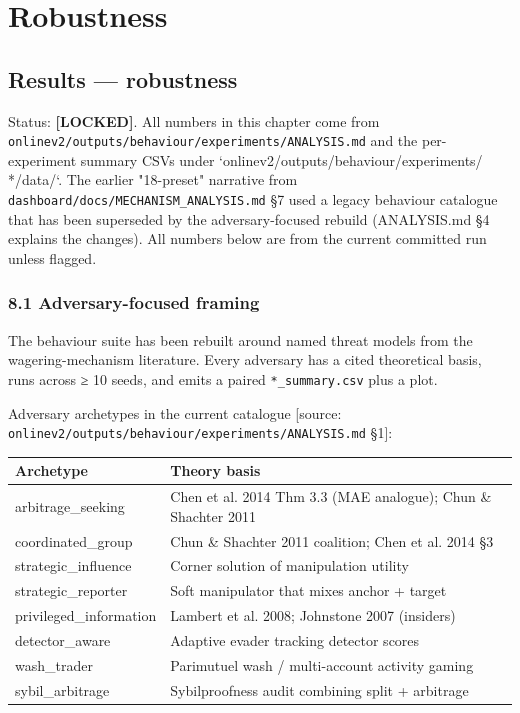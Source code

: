\documentclass[11pt,a4paper,openany]{report}
\begin{document}
\part*{Robustness}
\chapter{Results — robustness}

Status: \textbf{[LOCKED]}. All numbers in this chapter come from
\texttt{onlinev2/outputs/behaviour/experiments/ANALYSIS.md} and the per-
experiment summary CSVs under `onlinev2/outputs/behaviour/experiments/
*/data/`. The earlier "18-preset" narrative from
\texttt{dashboard/docs/MECHANISM\_ANALYSIS.md} §7 used a legacy behaviour
catalogue that has been superseded by the adversary-focused rebuild
(ANALYSIS.md §4 explains the changes). All numbers below are from the
current committed run unless flagged.

\section{8.1 Adversary-focused framing}

The behaviour suite has been rebuilt around named threat models from
the wagering-mechanism literature. Every adversary has a cited
theoretical basis, runs across ≥ 10 seeds, and emits a paired
\texttt{*\_summary.csv} plus a plot.

Adversary archetypes in the current catalogue [source:
\texttt{onlinev2/outputs/behaviour/experiments/ANALYSIS.md} §1]:

\begin{center}
\small
\begin{tabular}{ll}
\toprule
\textbf{Archetype} & \textbf{Theory basis} \\
\midrule
arbitrage\_seeking & Chen et al. 2014 Thm 3.3 (MAE analogue); Chun \& Shachter 2011 \\
coordinated\_group & Chun \& Shachter 2011 coalition; Chen et al. 2014 §3 \\
strategic\_influence & Corner solution of manipulation utility \\
strategic\_reporter & Soft manipulator that mixes anchor + target \\
privileged\_information & Lambert et al. 2008; Johnstone 2007 (insiders) \\
detector\_aware & Adaptive evader tracking detector scores \\
wash\_trader & Parimutuel wash / multi-account activity gaming \\
sybil\_arbitrage & Sybilproofness audit combining split + arbitrage \\
\bottomrule
\end{tabular}
\end{center}
\end{document}
